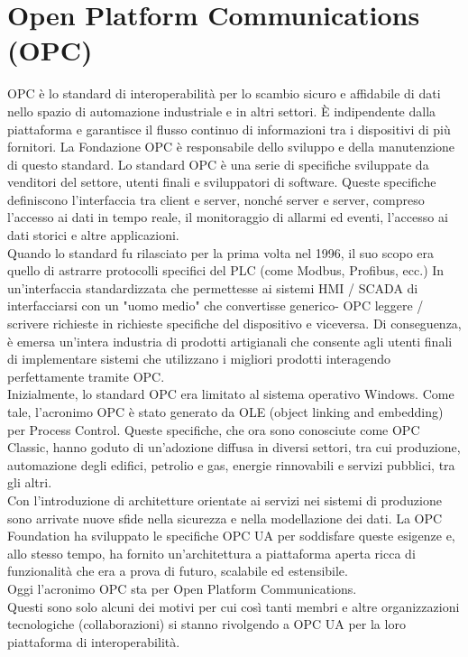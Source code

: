 \documentclass[12pt, a4paper, oneside]{book}
\begin{document}
\section{Open Platform Communications (OPC)}
OPC \cite{OCP} è lo standard di interoperabilità per lo scambio sicuro e affidabile di dati nello spazio di automazione industriale e in altri settori. È indipendente dalla piattaforma e garantisce il flusso continuo di informazioni tra i dispositivi di più fornitori. La Fondazione OPC è responsabile dello sviluppo e della manutenzione di questo standard.
Lo standard OPC è una serie di specifiche sviluppate da venditori del settore, utenti finali e sviluppatori di software. Queste specifiche definiscono l'interfaccia tra client e server, nonché server e server, compreso l'accesso ai dati in tempo reale, il monitoraggio di allarmi ed eventi, l'accesso ai dati storici e altre applicazioni.
\\Quando lo standard fu rilasciato per la prima volta nel 1996, il suo scopo era quello di astrarre protocolli specifici del PLC (come Modbus, Profibus, ecc.) In un'interfaccia standardizzata che permettesse ai sistemi HMI / SCADA di interfacciarsi con un "uomo medio" che convertisse generico- OPC leggere / scrivere richieste in richieste specifiche del dispositivo e viceversa. Di conseguenza, è emersa un'intera industria di prodotti artigianali che consente agli utenti finali di implementare sistemi che utilizzano i migliori prodotti interagendo perfettamente tramite OPC.
\\Inizialmente, lo standard OPC era limitato al sistema operativo Windows. Come tale, l'acronimo OPC è stato generato da OLE (object linking and embedding) per Process Control. Queste specifiche, che ora sono conosciute come OPC Classic, hanno goduto di un'adozione diffusa in diversi settori, tra cui produzione, automazione degli edifici, petrolio e gas, energie rinnovabili e servizi pubblici, tra gli altri.
\\Con l'introduzione di architetture orientate ai servizi nei sistemi di produzione sono arrivate nuove sfide nella sicurezza e nella modellazione dei dati. La OPC Foundation ha sviluppato le specifiche OPC UA per soddisfare queste esigenze e, allo stesso tempo, ha fornito un'architettura a piattaforma aperta ricca di funzionalità che era a prova di futuro, scalabile ed estensibile.
\\Oggi l'acronimo OPC sta per Open Platform Communications.
\\Questi sono solo alcuni dei motivi per cui così tanti membri e altre organizzazioni tecnologiche (collaborazioni) si stanno rivolgendo a OPC UA per la loro piattaforma di interoperabilità.
\end{document}
